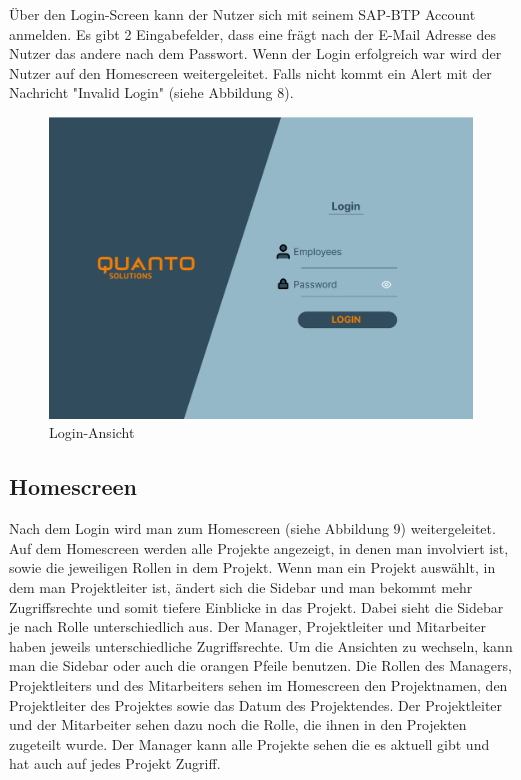 \documentclass{article}
\begin{document}
Über den Login-Screen kann der Nutzer sich mit seinem SAP-BTP Account anmelden. Es gibt 2 Eingabefelder, dass eine frägt nach der E-Mail Adresse des Nutzer das andere nach dem Passwort.
Wenn der Login erfolgreich war wird der Nutzer auf den Homescreen weitergeleitet. Falls nicht kommt ein Alert mit der Nachricht "Invalid Login" (siehe Abbildung 8).

\begin{figure}[h]
    \includegraphics[height= 0.5\textwidth,width= \textwidth]{images/Login.png}
    \caption{Login-Ansicht}
    \label{fig:beispiel}
\end{figure}

\subsection{Homescreen}
Nach dem Login wird man zum Homescreen (siehe Abbildung 9) weitergeleitet. Auf
dem Homescreen werden alle Projekte angezeigt, in denen man involviert ist,
sowie die jeweiligen Rollen in dem Projekt. Wenn man ein Projekt auswählt, in
dem man Projektleiter ist, ändert sich die Sidebar und man bekommt mehr
Zugriffsrechte und somit tiefere Einblicke in das Projekt. Dabei sieht die
Sidebar je nach Rolle unterschiedlich aus. Der Manager, Projektleiter und
Mitarbeiter haben jeweils unterschiedliche Zugriffsrechte. Um die Ansichten zu
wechseln, kann man die Sidebar oder auch die orangen Pfeile benutzen. Die
Rollen des Managers, Projektleiters und des Mitarbeiters sehen im Homescreen
den Projektnamen, den Projektleiter des Projektes sowie das Datum des
Projektendes. Der Projektleiter und der Mitarbeiter sehen dazu noch die Rolle,
die ihnen in den Projekten zugeteilt wurde. Der Manager kann alle Projekte
sehen die es aktuell gibt und hat auch auf jedes Projekt Zugriff.
\end{document}
